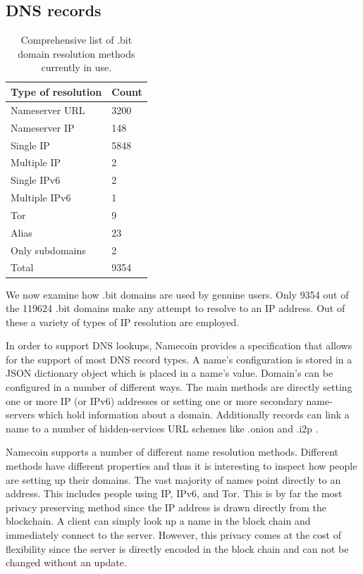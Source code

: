 \subsection{DNS records}

\begin{table}[t]
\centering
\begin{tabular}{ll}
Type of resolution & Count \\ \hline
Nameserver URL     & 3200  \\
Nameserver IP      & 148   \\
Single IP          & 5848  \\
Multiple IP        & 2     \\
Single IPv6        & 2     \\
Multiple IPv6      & 1     \\
Tor                & 9    \\
Alias              & 23    \\
Only subdomains    & 2   \\ \hline
Total              & 9354
\end{tabular}
\caption{Comprehensive list of .bit domain resolution methods currently in use.}
\end{table}

We now examine how .bit domains are used by genuine users. Only 9354 out of the 119624 .bit domains make any attempt to resolve to an IP address. Out of these a variety of types of IP resolution are employed.

In order to support DNS lookups, Namecoin provides a specification that allows for the support of most DNS record types. A name's configuration is stored in a JSON dictionary object which is placed in a name's value. Domain's can be configured in a number of different ways. The main methods are directly setting one or more IP (or IPv6) addresses or setting one or more secondary name-servers which hold information about a domain. Additionally records can link a name to a number of hidden-services URL schemes like .onion \cite{onion} and .i2p \cite{i2p}.

Namecoin supports a number of different name resolution methods. Different methods have different properties and thus it is interesting to inspect how people are setting up their domains. The vast majority of names point directly to an address. This includes people using IP, IPv6, and Tor. This is by far the most privacy preserving method since the IP address is drawn directly from the blockchain. A client can simply look up a name in the block chain and immediately connect to the server. However, this privacy comes at the cost of flexibility since the server is directly encoded in the block chain and can not be changed without an update.


